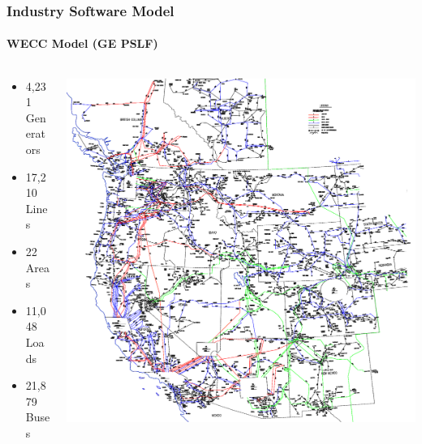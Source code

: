 \documentclass[14pt, unknownkeysallowed]{beamer}
\begin{document}
\begin{frame}
\frametitle{Industry Software Model}
\framesubtitle{WECC Model (GE PSLF)}
\begin{columns}
\begin{column}{0.45\textwidth}
   \begin{itemize}
   	\item 4,231 Generators
   	\item 17,210 Lines
 	\item 22 Areas
   	\item 11,048 Loads
	\item 21,879 Buses
\end{itemize}
\end{column}
\begin{column}{0.5\textwidth}
{\tiny \cite{MTlegReport} }
\includegraphics[height=.8\textheight]{WECCauto}  %
\end{column}
\end{columns}
\end{frame}

\end{document}
